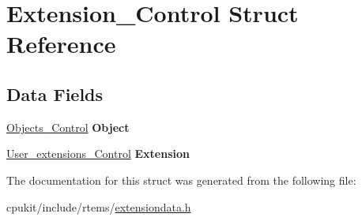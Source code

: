 \hypertarget{structExtension__Control}{}\section{Extension\+\_\+\+Control Struct Reference}
\label{structExtension__Control}
\subsection*{Data Fields}
\begin{DoxyCompactItemize}
\item 
\mbox{\label{structExtension__Control_a389e31b0e2f638ae8b95345ca616b3ae}} 
\mbox{\hyperlink{structObjects__Control}{Objects\+\_\+\+Control}} {\bfseries Object}
\item 
\mbox{\label{structExtension__Control_aca340a9d782c0af0bdec382643b9a3c0}} 
\mbox{\hyperlink{structUser__extensions__Control}{User\+\_\+extensions\+\_\+\+Control}} {\bfseries Extension}
\end{DoxyCompactItemize}


The documentation for this struct was generated from the following file\+:\begin{DoxyCompactItemize}
\item 
cpukit/include/rtems/\mbox{\hyperlink{extensiondata_8h}{extensiondata.\+h}}\end{DoxyCompactItemize}
